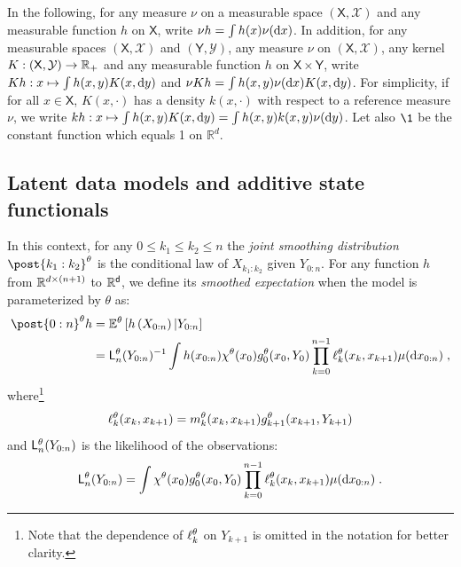 \documentclass{article}
\begin{document}
In the following, for any measure $\nu$ on a measurable space $(\mathsf{X},\mathcal{X})$ and any measurable function $h$ on $\mathsf{X}$, write $\nu h = \int h(x)\nu(\mathrm{d} x)$. In addition, for any measurable spaces $(\mathsf{X},\mathcal{X})$ and $(\mathsf{Y},\mathcal{Y})$, any measure $\nu$ on  $(\mathsf{X},\mathcal{X})$, any kernel $K:(\mathsf{X},\mathcal{Y})\to \mathbb{R}_+$ and any measurable function $h$ on $\mathsf{X}\times \mathsf{Y}$, write $K h: x\mapsto  \int h(x,y)K(x,\mathrm{d} y)$ and $\nu K h = \int h(x,y)\nu(\mathrm{d} x)K(x,\mathrm{d} y)$. For simplicity, if for all $x\in \mathsf{X}$, $K(x,\cdot)$ has a density $k(x,\cdot)$ with respect to a reference measure $\nu$, we write $k h: x\mapsto  \int h(x,y)K(x,\mathrm{d} y) = \int h(x,y)k(x,y)\nu(\mathrm{d} y)$. Let also $\1$ be the constant function which equals 1 on $\mathbb{R}^d$.

\subsection{Latent data models and additive state functionals}



In this context, for any $0\leqslant k_1 \leqslant k_2 \leqslant n$ the \textit{joint smoothing distribution} $\post{k_1:k_2}^\parvec$ is the conditional law of $X_{k_1:k_2}$ given $Y_{0:n}$. 
For any function $h$ from $\mathbb{R}^{d \times (n + 1)}$ to $\mathbb{R}^{\mathsf{d}}$, we define its \textit{smoothed expectation} when the model is parameterized by $\theta$ as:
\begin{align}
\label{eq:smoothing:expectation}
\post{0:n}^{\parvec} h &= \pE^{\parvec}\left[h\left(X_{0:n}\right)\vert Y_{0:n}\right] \\
&= \llh{n}{\parvec}(Y_{0:n})^{-1} \int h(x_{0:n}) \chi^\parvec(x_0)\md{0}{\parvec}(x_{0},Y_{0})\prod_{k=0}^{n-1}\qg{k}{\parvec}(x_{k},x_{k+1})\mu(\rmd x_{0:n})\eqsp,\nonumber
\end{align}
where\footnote{Note that the dependence of $\ell_{k}^{\theta}$ on $Y_{k+1}$ is omitted in the notation for better clarity.} 
$$
\ell_{k}^{\theta}(x_{k},x_{k+1}) = m_{k}^{\theta}(x_{k}, x_{k+1})g_{k+1}^{\theta}(x_{k+1},Y_{k+1})
$$
and $\mathsf{L}_{n}^{\theta}(Y_{0:n})$ is the likelihood of the observations:
\begin{equation}
\label{eq:likelihood}
\mathsf{L}_{n}^{\theta}(Y_{0:n})  = \int \chi^\theta(x_0)g_{0}^{\theta}(x_{0},Y_{0})\prod_{k=0}^{n-1} \ell_{k}^{\theta}(x_{k},x_{k+1})\mu(\mathrm{d} x_{0:n})\;.
\end{equation}
\end{document}
